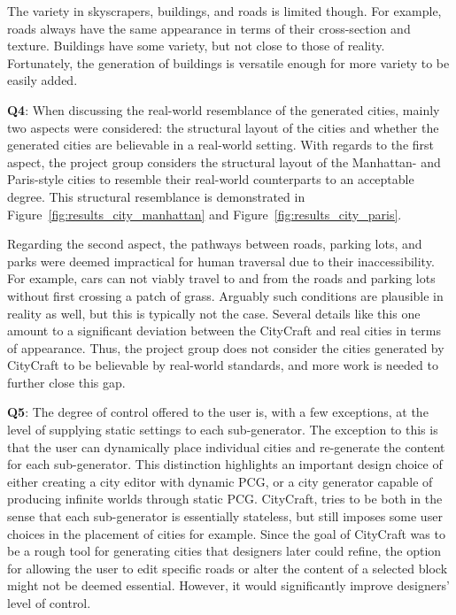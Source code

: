 The variety in skyscrapers, buildings, and roads is limited though.
For example, roads always have the same appearance in terms of their cross-section and texture.
Buildings have some variety, but not close to those of reality.
Fortunately, the generation of buildings is versatile enough for more variety to be easily added.

\textbf{Q4}:
When discussing the real-world resemblance of the generated cities, mainly two aspects were considered: the structural layout of the cities and whether the generated cities are believable in a real-world setting. 
With regards to the first aspect, the project group considers the structural layout of the Manhattan- and Paris-style cities to resemble their real-world counterparts to an acceptable degree.
This structural resemblance is demonstrated in Figure~\ref{fig:results_city_manhattan} and Figure~\ref{fig:results_city_paris}.

Regarding the second aspect, the pathways between roads, parking lots, and parks were deemed impractical for human traversal due to their inaccessibility.
For example, cars can not viably travel to and from the roads and parking lots without first crossing a patch of grass.
Arguably such conditions are plausible in reality as well, but this is typically not the case.
Several details like this one amount to a significant deviation between the CityCraft and real cities in terms of appearance.
Thus, the project group does not consider the cities generated by CityCraft to be believable by real-world standards, and more work is needed to further close this gap.

\textbf{Q5}:
The degree of control offered to the user is, with a few exceptions, at the level of supplying static settings to each sub-generator.
The exception to this is that the user can dynamically place individual cities and re-generate the content for each sub-generator.
This distinction highlights an important design choice of either creating a city editor with dynamic PCG, or a city generator capable of producing infinite worlds through static PCG.
CityCraft, tries to be both in the sense that each sub-generator is essentially stateless, but still imposes some user choices in the placement of cities for example.
Since the goal of CityCraft was to be a rough tool for generating cities that designers later could refine, the option for allowing the user to edit specific roads or alter the content of a selected block might not be deemed essential.
However, it would significantly improve designers' level of control.

